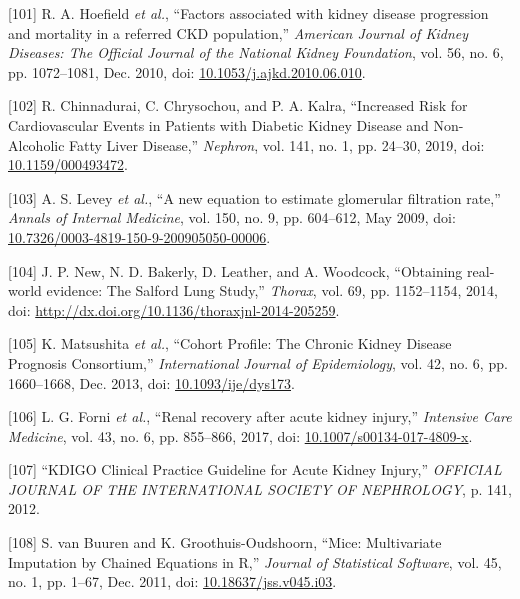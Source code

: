 \documentclass[12pt,PhD,twoside,openright]{muthesis}
\newenvironment{cslreferences}%
  {}%
  {\par}
\begin{document}
\begin{cslreferences}
\leavevmode\hypertarget{ref-hoefield_factors_2010}{}%
{[}101{]} R. A. Hoefield \emph{et al.}, ``Factors associated with kidney disease progression and mortality in a referred CKD population,'' \emph{American Journal of Kidney Diseases: The Official Journal of the National Kidney Foundation}, vol. 56, no. 6, pp. 1072--1081, Dec. 2010, doi: \href{https://doi.org/10.1053/j.ajkd.2010.06.010}{10.1053/j.ajkd.2010.06.010}.

\leavevmode\hypertarget{ref-chinnadurai_increased_2019-1}{}%
{[}102{]} R. Chinnadurai, C. Chrysochou, and P. A. Kalra, ``Increased Risk for Cardiovascular Events in Patients with Diabetic Kidney Disease and Non-Alcoholic Fatty Liver Disease,'' \emph{Nephron}, vol. 141, no. 1, pp. 24--30, 2019, doi: \href{https://doi.org/10.1159/000493472}{10.1159/000493472}.

\leavevmode\hypertarget{ref-levey_new_2009}{}%
{[}103{]} A. S. Levey \emph{et al.}, ``A new equation to estimate glomerular filtration rate,'' \emph{Annals of Internal Medicine}, vol. 150, no. 9, pp. 604--612, May 2009, doi: \href{https://doi.org/10.7326/0003-4819-150-9-200905050-00006}{10.7326/0003-4819-150-9-200905050-00006}.

\leavevmode\hypertarget{ref-new_obtaining_2014}{}%
{[}104{]} J. P. New, N. D. Bakerly, D. Leather, and A. Woodcock, ``Obtaining real-world evidence: The Salford Lung Study,'' \emph{Thorax}, vol. 69, pp. 1152--1154, 2014, doi: \href{https://doi.org/http://dx.doi.org/10.1136/thoraxjnl-2014-205259}{http://dx.doi.org/10.1136/thoraxjnl-2014-205259}.

\leavevmode\hypertarget{ref-matsushita_cohort_2013}{}%
{[}105{]} K. Matsushita \emph{et al.}, ``Cohort Profile: The Chronic Kidney Disease Prognosis Consortium,'' \emph{International Journal of Epidemiology}, vol. 42, no. 6, pp. 1660--1668, Dec. 2013, doi: \href{https://doi.org/10.1093/ije/dys173}{10.1093/ije/dys173}.

\leavevmode\hypertarget{ref-forni_renal_2017-1}{}%
{[}106{]} L. G. Forni \emph{et al.}, ``Renal recovery after acute kidney injury,'' \emph{Intensive Care Medicine}, vol. 43, no. 6, pp. 855--866, 2017, doi: \href{https://doi.org/10.1007/s00134-017-4809-x}{10.1007/s00134-017-4809-x}.

\leavevmode\hypertarget{ref-noauthor_kdigo_2012}{}%
{[}107{]} ``KDIGO Clinical Practice Guideline for Acute Kidney Injury,'' \emph{OFFICIAL JOURNAL OF THE INTERNATIONAL SOCIETY OF NEPHROLOGY}, p. 141, 2012.

\leavevmode\hypertarget{ref-buuren_mice_2011-1}{}%
{[}108{]} S. van Buuren and K. Groothuis-Oudshoorn, ``Mice: Multivariate Imputation by Chained Equations in R,'' \emph{Journal of Statistical Software}, vol. 45, no. 1, pp. 1--67, Dec. 2011, doi: \href{https://doi.org/10.18637/jss.v045.i03}{10.18637/jss.v045.i03}.


\end{cslreferences}
\end{document}
